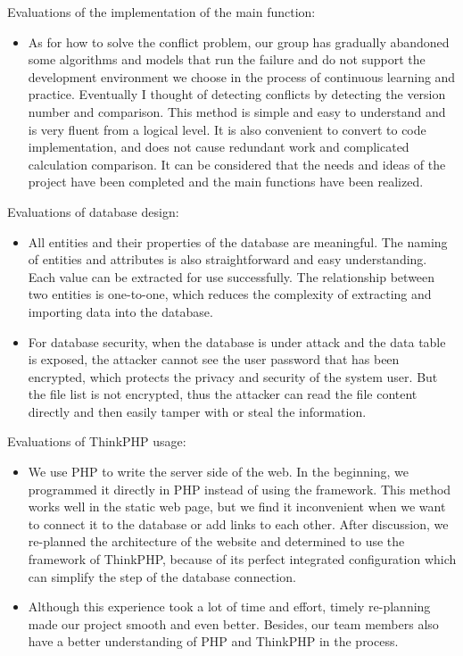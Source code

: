 \noindent Evaluations of the implementation of the main function:
\begin{itemize}
    \item As for how to solve the conflict problem, our group has gradually abandoned some algorithms and models that run the failure and do not support the development environment we choose in the process of continuous learning and practice. Eventually I thought of detecting conflicts by detecting the version number and comparison. This method is simple and easy to understand and is very fluent from a logical level. It is also convenient to convert to code implementation, and does not cause redundant work and complicated calculation comparison. It can be considered that the needs and ideas of the project have been completed and the main functions have been realized.
\end{itemize}

\noindent Evaluations of database design:
\begin{itemize}
    \item All entities and their properties of the database are meaningful. The naming of entities and attributes is also straightforward and easy understanding. Each value can be extracted for use successfully. The relationship between two entities is one-to-one, which reduces the complexity of extracting and importing data into the database.

    \item For database security, when the database is under attack and the data table is exposed, the attacker cannot see the user password that has been encrypted, which protects the privacy and security of the system user. But the file list is not encrypted, thus the attacker can read the file content directly and then easily tamper with or steal the information.

\end{itemize}

\noindent Evaluations of ThinkPHP usage:
\begin{itemize}
    \item We use PHP to write the server side of the web. In the beginning, we programmed it directly in PHP instead of using the framework. This method works well in the static web page, but we find it inconvenient when we want to connect it to the database or add links to each other. After discussion, we re-planned the architecture of the website and determined to use the framework of ThinkPHP, because of its perfect integrated configuration which can simplify the step of the database connection.
    \item Although this experience took a lot of time and effort, timely re-planning made our project smooth and even better. Besides, our team members also have a better understanding of PHP and ThinkPHP in the process.

\end{itemize}

